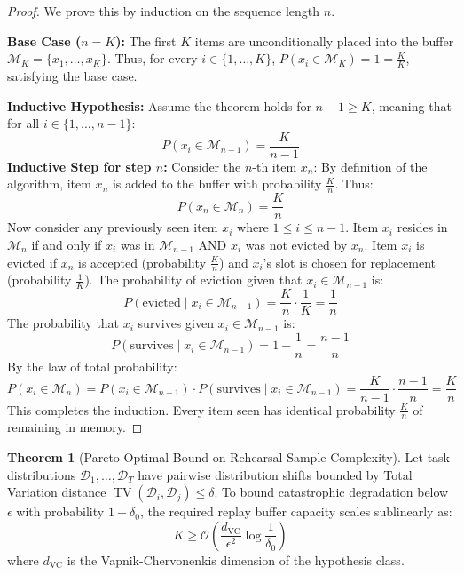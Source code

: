 \documentclass[11pt,a4paper]{article}
\theoremstyle{definition}
\newtheorem{theorem}{\textbf{Theorem}}[section]
\begin{document}
\begin{proof}
We prove this by induction on the sequence length $n$.

\textbf{Base Case ($n = K$):}
The first $K$ items are unconditionally placed into the buffer $\mathcal{M}_K = \{x_1, \dots, x_K\}$.
Thus, for every $i \in \{1, \dots, K\}$, $P(x_i \in \mathcal{M}_K) = 1 = \frac{K}{K}$, satisfying the base case.

\textbf{Inductive Hypothesis:}
Assume the theorem holds for $n - 1 \ge K$, meaning that for all $i \in \{1, \dots, n - 1\}$:
{\boldmath
\begin{equation}
P(x_i \in \mathcal{M}_{n-1}) = \frac{K}{n - 1}
\end{equation}
}
\textbf{Inductive Step for step $n$:}
Consider the $n$-th item $x_n$:
By definition of the algorithm, item $x_n$ is added to the buffer with probability $\frac{K}{n}$.
Thus:
{\boldmath
\begin{equation}
P(x_n \in \mathcal{M}_n) = \frac{K}{n}
\end{equation}
}
Now consider any previously seen item $x_i$ where $1 \le i \le n - 1$.
Item $x_i$ resides in $\mathcal{M}_n$ if and only if $x_i$ was in $\mathcal{M}_{n-1}$ AND $x_i$ was not evicted by $x_n$.
Item $x_i$ is evicted if $x_n$ is accepted (probability $\frac{K}{n}$) and $x_i$'s slot is chosen for replacement (probability $\frac{1}{K}$).
The probability of eviction given that $x_i \in \mathcal{M}_{n-1}$ is:
{\boldmath
\begin{equation}
P(\text{evicted} \mid x_i \in \mathcal{M}_{n-1}) = \frac{K}{n} \cdot \frac{1}{K} = \frac{1}{n}
\end{equation}
}
The probability that $x_i$ survives given $x_i \in \mathcal{M}_{n-1}$ is:
{\boldmath
\begin{equation}
P(\text{survives} \mid x_i \in \mathcal{M}_{n-1}) = 1 - \frac{1}{n} = \frac{n - 1}{n}
\end{equation}
}
By the law of total probability:
{\boldmath
\begin{equation}
P(x_i \in \mathcal{M}_n) = P(x_i \in \mathcal{M}_{n-1}) \cdot P(\text{survives} \mid x_i \in \mathcal{M}_{n-1}) = \frac{K}{n - 1} \cdot \frac{n - 1}{n} = \frac{K}{n}
\end{equation}
}
This completes the induction. Every item seen has identical probability $\frac{K}{n}$ of remaining in memory.
\end{proof}

\begin{theorem}[Pareto-Optimal Bound on Rehearsal Sample Complexity]
Let task distributions $\mathcal{D}_1, \dots, \mathcal{D}_T$ have pairwise distribution shifts bounded by Total Variation distance $\operatorname{TV}(\mathcal{D}_i, \mathcal{D}_j) \le \delta$. To bound catastrophic degradation below $\epsilon$ with probability $1 - \delta_0$, the required replay buffer capacity scales sublinearly as:
{\boldmath
\begin{equation}
K \ge \mathcal{O}\left( \frac{d_{\text{VC}}}{\epsilon^2} \log \frac{1}{\delta_0} \right)
\end{equation}
}
where $d_{\text{VC}}$ is the Vapnik-Chervonenkis dimension of the hypothesis class.
\end{theorem}
\end{document}

